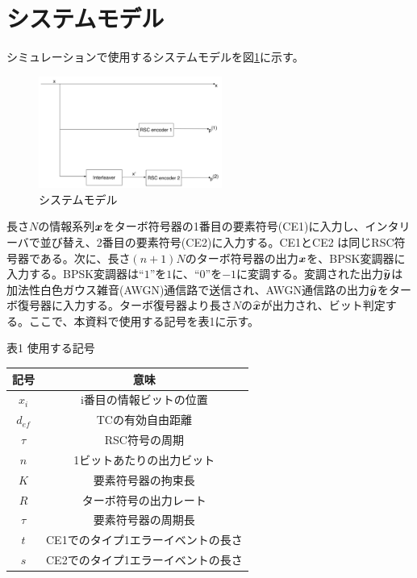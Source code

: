 \documentclass[twoside]{jarticle}
\begin{document}
\section{システムモデル}
シミュレーションで使用するシステムモデルを図\ref{SystemModel}に示す。
\begin{center}
\begin{figure}[h!]
\includegraphics[width=6cm]{TurboEncoder.pdf}
\caption{システムモデル}
\label{SystemModel}
\end{figure}
\end{center}
長さ$N$の情報系列${\mbox{\boldmath$x$}}$をターボ符号器の1番目の要素符号(CE1)に入力し、インタリーバで並び替え、2番目の要素符号(CE2)に入力する。CE1とCE2 は同じRSC符号器である。次に、長さ$(n+1)N$のターボ符号器の出力${\mbox{\boldmath$x$}}$を、BPSK変調器に入力する。BPSK変調器は``$1$''を$1$に、``$0$''を$-1$に変調する。変調された出力$\widetilde{{\mbox{\boldmath$y$}}}$は加法性白色ガウス雑音(AWGN)通信路で送信され、AWGN通信路の出力$\widehat{{\mbox{\boldmath$y$}}}$をターボ復号器に入力する。ターボ復号器より長さ$N$の$\widehat{{\mbox{\boldmath$x$}}}$が出力され、ビット判定する。ここで、本資料で使用する記号を表1に示す。

\begin{center}
表1 使用する記号
 \begin{tabular}{||c c||} 
 \hline
 記号 & 意味\\ [0.5ex] 
 \hline\hline
 $x_i$ & i番目の情報ビットの位置  \\ 
 
  $d_{ef}$ &TCの有効自由距離  \\ 
  
   $\tau$ & RSC符号の周期  \\ 
 
 $n$ & 1ビットあたりの出力ビット  \\
 
 $K$ & 要素符号器の拘束長 \\
 
 $R$ & ターボ符号の出力レート \\
 
 $\tau$ &  要素符号器の周期長 \\
 
 $t$ & CE1でのタイプ1エラーイベントの長さ\\ 
 
  $s$ & CE2でのタイプ1エラーイベントの長さ\\ [1ex] 
 \hline
\end{tabular}
\end{center}
\end{document}
